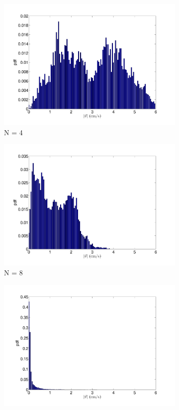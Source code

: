 \documentclass[12pt]{article}
\begin{document}
\begin{figure}[h!]
\begin{subfigure}[h!]{0.5\textwidth}
       \includegraphics[scale=0.28]{cb_4_3mm_60mm_v_pdf.pdf}
       \caption{N = 4}
       \label{fig:vpdf_4}
	\end{subfigure}
	\hfill
	\begin{subfigure}[h!]{0.5\textwidth}
    \centering
       \includegraphics[scale=0.28]{cb_8_3mm_60mm_v_pdf.pdf}
       \caption{N = 8}
       \label{fig:vpdf_8}
	\end{subfigure}
	\begin{subfigure}[h!]{0.5\textwidth}
    \centering
       \includegraphics[scale=0.28]{cb_21_3mm_60mm_v_pdf.pdf}

\end{subfigure}
\end{figure}
\end{document}
